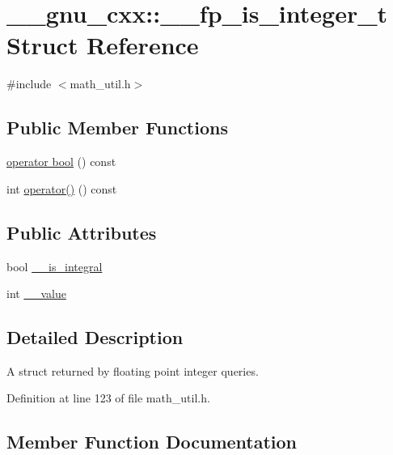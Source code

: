 \hypertarget{struct____gnu__cxx_1_1____fp__is__integer__t}{}\section{\+\_\+\+\_\+gnu\+\_\+cxx\+:\+:\+\_\+\+\_\+fp\+\_\+is\+\_\+integer\+\_\+t Struct Reference}
\label{struct____gnu__cxx_1_1____fp__is__integer__t}


{\ttfamily \#include $<$math\+\_\+util.\+h$>$}

\subsection*{Public Member Functions}
\begin{DoxyCompactItemize}
\item 
\hyperlink{struct____gnu__cxx_1_1____fp__is__integer__t_afc9b00da3136c9a50bec45276c1135c0}{operator bool} () const 
\item 
int \hyperlink{struct____gnu__cxx_1_1____fp__is__integer__t_a3ba89d0930fec5ce584ef39d6bbdde9f}{operator()} () const 
\end{DoxyCompactItemize}
\subsection*{Public Attributes}
\begin{DoxyCompactItemize}
\item 
bool \hyperlink{struct____gnu__cxx_1_1____fp__is__integer__t_a11cf72023d9f2eb1e3982d093de58493}{\+\_\+\+\_\+is\+\_\+integral}
\item 
int \hyperlink{struct____gnu__cxx_1_1____fp__is__integer__t_ad30e10c2e2dc2b23d42b4bbbf5592425}{\+\_\+\+\_\+value}
\end{DoxyCompactItemize}


\subsection{Detailed Description}
A struct returned by floating point integer queries. 

Definition at line 123 of file math\+\_\+util.\+h.



\subsection{Member Function Documentation}
